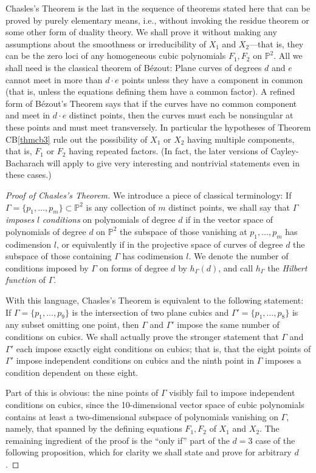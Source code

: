 \documentclass{bull-l}
\theoremstyle{pplain}
\theoremstyle{definition}
\begin{document}
Chasles's Theorem is the last in the sequence of theorems stated here that can
be proved by purely elementary means, i.e., without invoking the residue 
theorem or some other form of duality theory.  We shall prove it without making
any assumptions about the smoothness or irreducibility of $X_1$ and
$X_2$---that is, they can be the zero loci of any homogeneous cubic polynomials
$F_1,F_2$ on $\mathbb{P}^2$.  All we shall need is the classical theorem of
B\'ezout: Plane curves of degrees $d$ and $e$ cannot meet in more than $d\cdot
e$  points unless they have a component in common (that is, unless the
equations defining them have a common factor).  A refined form of B\'ezout's
Theorem says that if the curves have no common component and meet in $d\cdot e$
distinct  points, then the curves must each be nonsingular at these points and
must meet transversely.  In particular the hypotheses of Theorem CB\ref{thmcb3} 
rule out the possibility of $X_1$ or $X_2$ having multiple components, that is,
$F_1$ or $F_2$ having repeated factors.  (In fact, the later versions of
Cayley-Bacharach will apply to give very interesting and nontrivial statements
even in these cases.)

\begin{proof}[Proof of Chasles's Theorem]
We introduce a piece of classical terminology: If $\Gamma=\{p_1,\dots,p_m\}
\subset \mathbb{P}^2$ is any collection of $m$ distinct points, we shall say
that $\Gamma$ \emph{imposes} $l$ \emph{conditions} on polynomials of degree $d$
if in the vector space of polynomials of degree $d$ on $\mathbb{P}^2$ the
subspace of those vanishing at $p_1,\dots,p_m$ has codimension $l$, or 
equivalently if in the projective space of curves of degree $d$ the subspace of
those containing $\Gamma$ has codimension $l$. We denote the number of 
conditions imposed by $\Gamma$ on forms of degree $d$ by $h_\Gamma(d)$, and
call $h_\Gamma$ the \emph{Hilbert function} of $\Gamma$.

With this language, Chasles's Theorem is equivalent to the following statement:
If $\Gamma=\{p_1,\dots,p_9\}$ is the intersection of two plane cubics and $
\Gamma'=\{p_1,\dots,p_8\}$ is any subset omitting one point, then $\Gamma$ and
$\Gamma'$ impose the same number of conditions on cubics.  We shall actually
prove the stronger statement that $\Gamma$ and $\Gamma'$ each impose exactly
eight conditions on cubics; that is, that the eight points of $\Gamma'$ impose
independent conditions on cubics and the ninth point in $\Gamma$ imposes a 
condition dependent on these eight.

Part of this is obvious: the nine points of $\Gamma$ visibly fail to impose
independent conditions on cubics, since the 10-dimensional vector space of
cubic polynomials contains at least a two-dimensional subspace of polynomials
vanishing on $\Gamma$, namely, that spanned by the defining equations $F_1,F_2$
of $X_1$ and $X_2$.  The remaining ingredient of the proof is the ``only if''
part of the $d=3$ case of the following proposition, which for clarity we shall
state and prove for arbitrary $d$.
\renewcommand{\qed}{}
\end{proof}
\end{document}
